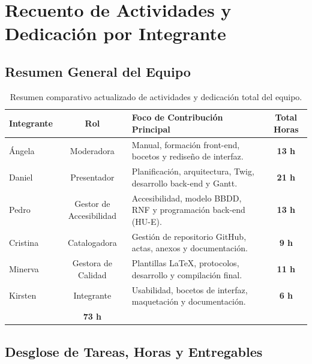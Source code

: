 \section{Recuento de Actividades y Dedicación por Integrante}

\subsection{Resumen General del Equipo}

\begin{table}[H]
\centering
\small
{}
\begin{tabularx}{\textwidth}{X c X c}
\toprule
\rowcolor{azulPastelApagado}
\textbf{\color{textoOscuro}Integrante} & \textbf{\color{textoOscuro}Rol} & \textbf{\color{textoOscuro}Foco de Contribución Principal} & \textbf{\color{textoOscuro}Total Horas} \\
\midrule
Ángela   & Moderadora & Manual, formación front-end, bocetos y rediseño de interfaz. & \textbf{13 h} \\
Daniel   & Presentador & Planificación, arquitectura, Twig, desarrollo back-end y Gantt. & \textbf{21 h} \\
Pedro    & Gestor de Accesibilidad & Accesibilidad, modelo BBDD, RNF y programación back-end (HU-E). & \textbf{13 h} \\
Cristina & Catalogadora & Gestión de repositorio GitHub, actas, anexos y documentación. & \textbf{9 h} \\
Minerva  & Gestora de Calidad & Plantillas \LaTeX, protocolos, desarrollo y compilación final. & \textbf{11 h} \\
Kirsten  & Integrante & Usabilidad, bocetos de interfaz, maquetación y documentación. & \textbf{6 h} \\
\midrule
\rowcolor{azulclaro!60}
\multicolumn{3}{l}{\textbf{\color{textoOscuro}Total Horas Invertidas por el Equipo:}} & \textbf{\color{textoOscuro}73 h} \\
\bottomrule
\end{tabularx}
\caption{Resumen comparativo actualizado de actividades y dedicación total del equipo.}
\label{tab:resumen-horas}
\end{table}

\newpage
\subsection{Desglose de Tareas, Horas y Entregables}

